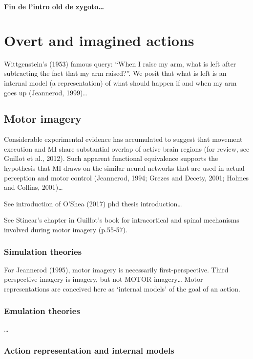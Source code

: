 \documentclass[a4paper,12pt,twoside,openright,oldfontcommands]{memoir}
\begin{document}
\textbf{Fin de l'intro old de zygoto\ldots{}}

\section{Overt and imagined actions}\label{overt-and-imagined-actions}

Wittgenstein's (1953) famous query: ``When I raise my arm, what is left
after subtracting the fact that my arm raised?''. We posit that what is
left is an internal model (a representation) of what should happen if
and when my arm goes up (Jeannerod, 1999)\ldots{}

\subsection{Motor imagery}\label{motor-imagery}

Considerable experimental evidence has accumulated to suggest that
movement execution and MI share substantial overlap of active brain
regions (for review, see Guillot et al., 2012). Such apparent functional
equivalence supports the hypothesis that MI draws on the similar neural
networks that are used in actual perception and motor control
(Jeannerod, 1994; Grezes and Decety, 2001; Holmes and Collins,
2001)\ldots{}

See introduction of O'Shea (2017) phd thesis introduction\ldots{}

See Stinear's chapter in Guillot's book for intracortical and spinal
mechanisms involved during motor imagery (p.55-57).

\subsubsection{Simulation theories}\label{simulation-theories}

For Jeannerod (1995), motor imagery is necessarily first-perspective.
Third perspective imagery is imagery, but not MOTOR imagery\ldots{}
Motor representations are conceived here as `internal models' of the
goal of an action.

\subsubsection{Emulation theories}\label{emulation-theories}

\ldots{}

\subsubsection{Action representation and internal
models}\label{action-representation-and-internal-models}
\end{document}
